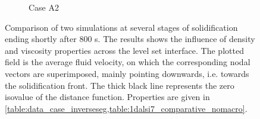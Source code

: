 \begin{figure}[htbp]
\begin{subfigure}{0.55\textwidth}
	\caption{Case A2}
    \label{fig:1dalsi7_equalprops}
  \end{subfigure}
\caption{Comparison of two simulations at several stages of solidification ending shortly after 800 s.
The results shows the influence of density and viscosity properties across the level set interface.
The plotted field is the average fluid velocity, on which the corresponding nodal vectors are superimposed, mainly pointing
downwards, i.e. towards the solidification front. The thick black line represents the zero isovalue of the distance function.
Properties are given in \cref{table:data_case_inverseseg,table:1dalsi7_comparative_nomacro}.}
\label{fig:1dalsi7_caseA1A2}
\end{figure}

